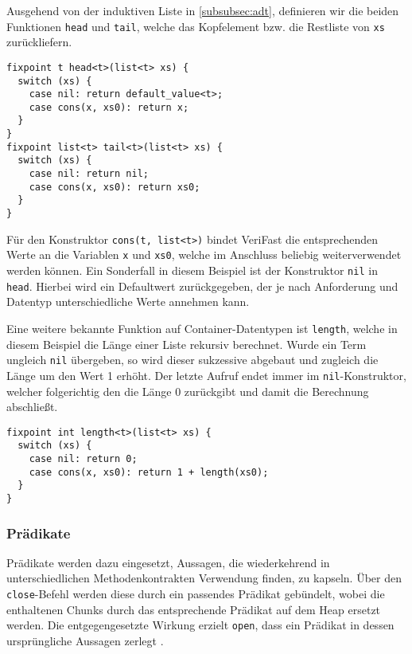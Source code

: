 Ausgehend von der induktiven Liste in \cref{subsubsec:adt}, definieren wir die beiden Funktionen \texttt{head} und \texttt{tail}, welche das Kopfelement bzw. die Restliste von \texttt{xs} zurückliefern.

\begin{lstlisting}
fixpoint t head<t>(list<t> xs) {
  switch (xs) {
    case nil: return default_value<t>;
    case cons(x, xs0): return x;
  }
}
fixpoint list<t> tail<t>(list<t> xs) {
  switch (xs) {
    case nil: return nil;
    case cons(x, xs0): return xs0;
  }
}
\end{lstlisting}

\noindent
Für den Konstruktor \texttt{cons(t, list<t>)} bindet VeriFast die entsprechenden Werte an die Variablen \texttt{x} und \texttt{xs0}, welche im Anschluss beliebig weiterverwendet werden können. Ein Sonderfall in diesem Beispiel ist der Konstruktor \texttt{nil} in \texttt{head}. Hierbei wird ein Defaultwert zurückgegeben, der je nach Anforderung und Datentyp unterschiedliche Werte annehmen kann.

Eine weitere bekannte Funktion auf Container-Datentypen ist \texttt{length}, welche in diesem Beispiel die Länge einer Liste rekursiv berechnet. Wurde ein Term ungleich \texttt{nil} übergeben, so wird dieser sukzessive abgebaut und zugleich die Länge um den Wert 1 erhöht. Der letzte Aufruf endet immer im \texttt{nil}-Konstruktor, welcher folgerichtig den die Länge 0 zurückgibt und damit die Berechnung abschließt.%

\begin{lstlisting}
fixpoint int length<t>(list<t> xs) {
  switch (xs) {
    case nil: return 0;
    case cons(x, xs0): return 1 + length(xs0);
  }
}
\end{lstlisting}

\subsubsection{Prädikate}

Prädikate werden dazu eingesetzt, Aussagen, die wiederkehrend in unterschiedlichen Methodenkontrakten Verwendung finden, zu kapseln. Über den \texttt{close}-Befehl werden diese durch ein passendes Prädikat gebündelt, wobei die enthaltenen Chunks durch das entsprechende Prädikat auf dem Heap ersetzt werden. Die entgegengesetzte Wirkung erzielt \texttt{open}, dass ein Prädikat in dessen ursprüngliche Aussagen zerlegt \cite{Jacobs2008,Jacobs2017}.

